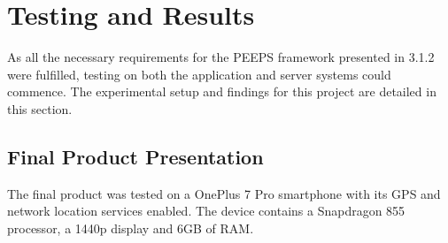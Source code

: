 \chapter{Testing and Results}
As all the necessary requirements for the PEEPS framework presented in 3.1.2 were fulfilled, testing on both the application and server systems could commence. The experimental setup and findings for this project are detailed in this section.


\section{Final Product Presentation}
The final product was tested on a OnePlus 7 Pro smartphone with its GPS and network location services enabled. The device contains a Snapdragon 855 processor, a 1440p display and 6GB of RAM.


